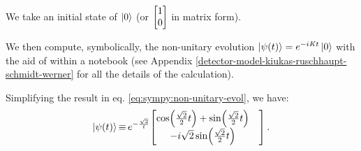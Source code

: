 We take an initial state of $\ket{0}$
(or $\mqty[1\\0]$ in matrix form).

We then compute, symbolically, the non-unitary evolution
$\ket{\psi(t)} = e^{-i\mathit{K}t}\ket{0}$
with the aid of  \parencite{comp:sympy} within a  \parencite{comp:jupyter} notebook
(see Appendix \ref{detector-model-kiukas-ruschhaupt-schmidt-werner} for all the details of the calculation).

Simplifying the result in eq. \eqref{eq:sympy:non-unitary-evol}, we have:
\begin{equation}
  \ket{\psi(t)} \repr e^{-\frac{\sqrt{2}}{t}} \mqty[
    \cos(\frac{\sqrt{2}}{2}t) + \sin(\frac{\sqrt{2}}{2}t)& \\
                     -i\sqrt{2} \sin(\frac{\sqrt{2}}{2}t)&
  ] \,\text{.}
\end{equation}

